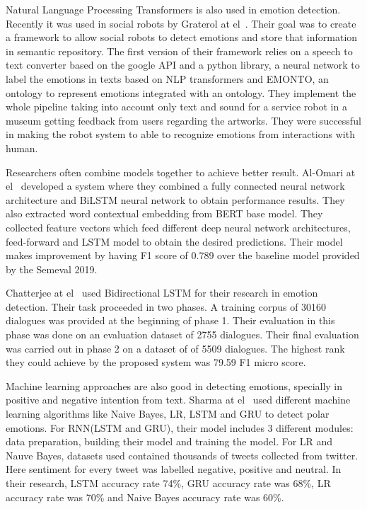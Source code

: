 \documentclass[runningheads]{llncs}
\begin{document}
Natural Language Processing Transformers is also used in emotion detection. Recently it was used in social robots by Graterol at el~\cite{ref31}. Their goal was to create a framework to allow social robots to detect emotions and store that information in semantic repository. The first version of their framework relies on a speech to text converter based on the google API and a python library, a neural network to label the emotions in texts based on NLP transformers and EMONTO, an ontology to represent emotions integrated with an ontology. They implement the whole pipeline taking into account only text and sound for a service robot in a museum getting feedback from users regarding the artworks. They were successful in making the robot system to able to recognize emotions from interactions with human.

Researchers often combine models together to achieve better result. Al-Omari at el~\cite{ref32} developed a system where they combined a fully connected neural network architecture and BiLSTM neural network to obtain performance results. They also extracted word contextual embedding from BERT base model. They collected feature vectors which feed different deep neural network architectures, feed-forward and LSTM model to obtain the desired predictions. Their model makes improvement by having F1 score of 0.789 over the baseline model provided by the Semeval 2019.

Chatterjee at el~\cite{ref33} used Bidirectional LSTM for their research in emotion detection. Their task proceeded in two phases. A training corpus of 30160 dialogues was provided at the beginning of phase 1. Their evaluation in this phase was done on an evaluation dataset of 2755 dialogues. Their final evaluation was carried out in phase 2 on a dataset of of 5509 dialogues. The highest rank they could achieve by the proposed system was 79.59 F1 micro score.

Machine learning approaches are also good in detecting emotions, specially in positive and negative intention from text. Sharma at el~\cite{ref34} used different machine learning algorithms like Naive Bayes, LR, LSTM and GRU to detect polar emotions. For RNN(LSTM and GRU), their model includes 3 different modules: data preparation, building their model and training the model. For LR and Nauve Bayes, datasets used contained thousands of tweets collected from twitter. Here sentiment for every tweet was labelled negative, positive and neutral. In their research, LSTM accuracy rate 74\%, GRU accuracy rate was 68\%, LR accuracy rate was 70\% and Naive Bayes accuracy rate was 60\%.
\end{document}
